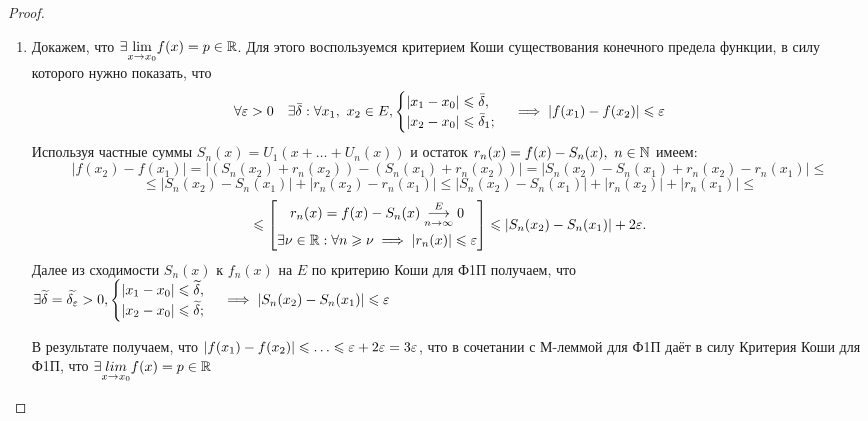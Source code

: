 \documentclass[../../main.tex]{subfiles}
\begin{document}
\begin{proof}
	\;
	\begin{enumerate}
		\item Докажем, что $\exists \underset{x \to x_0}{\lim} f(x) = 
	p \in \mathbb{R}$. Для этого воспользуемся критерием Коши существования 
	конечного предела функции, в силу которого нужно показать, что
	\begin{equation}
	\label{lec2:17}
	\forall \varepsilon > 0 \quad \exists \bar\delta :
	\forall x_1,\ x_2 \in E, 
	\begin{cases}
	|x_1 - x_0| \leqslant \bar\delta, \\
	|x_2 - x_0| \leqslant \bar\delta_1;
	\end{cases} \implies
	|f(x_1) - f(x_2)| \leqslant \varepsilon
	\end{equation}
	Используя частные суммы $S_n(x) = U_1(x + \ldots + U_n(x))$ и 
	остаток $r_n(x) = f(x) - S_n(x),\ n \in \mathbb{N}$ имеем:
	\[
	|f(x_2) - f(x_1)| = |(S_n(x_2) + r_n(x_2)) - (S_n(x_1) + r_n(x_2))| =
	|S_n(x_2) - S_n(x_1) + r_n(x_2) - r_n(x_1)| \leq 
	\]
	\[
	\leq |S_n(x_2) - S_n(x_1)| + |r_n(x_2) - r_n(x_1)| \leq 
	|S_n(x_2) - S_n(x_1)| + |r_n(x_2)| + |r_n(x_1)| \leq
	\]
	\[
	\leqslant 
	\left[
	\begin{gathered}
	r_n(x) = f(x) - S_n(x) \overset{E}
	{\underset{n \to \infty}\longrightarrow} 0 \\
	\exists \nu \in \mathbb{R} : \forall n \geqslant \nu \implies
	|r_n(x)| \leqslant \varepsilon
	\end{gathered}
	\right] \leqslant |S_n(x_2) - S_n(x_1)| + 2\varepsilon.
	\]
	Далее из сходимости $S_n(x)$ к $f_n(x)$ на $E$ по критерию Коши для Ф1П
	получаем, что $\exists \widetilde{\delta} = \widetilde{\delta_\varepsilon} > 0,
	\begin{cases} 
	|x_1 - x_0| \leqslant \widetilde{\delta}, \\
	|x_2 - x_0| \leqslant \widetilde{\delta};
	\end{cases} \implies
	|S_n(x_2) - S_n(x_1)| \leqslant \varepsilon$ 
	
	В результате получаем, что $|f(x_1) - f(x_2)| \leqslant \ldots \leqslant 
	\varepsilon + 2\varepsilon = 3\varepsilon$, что в сочетании с М-леммой для Ф1П даёт
	в силу Критерия Коши для Ф1П, что $\exists \underset{x \to x_0}{lim}
	f(x) = p \in \mathbb{R}$ 
	\end{enumerate}
\end{proof}







	
\end{document}

